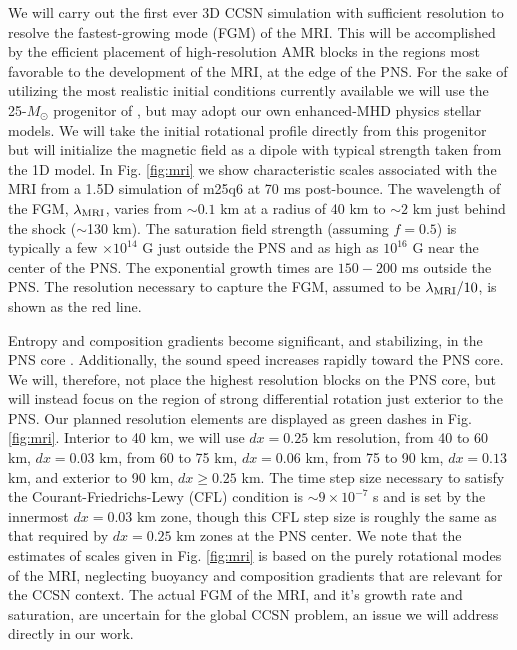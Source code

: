 We will carry out the first ever 3D CCSN simulation with sufficient resolution to resolve the fastest-growing mode (FGM) of the MRI.  
This will be accomplished by the efficient placement of high-resolution AMR blocks in the regions most favorable to the development of the MRI, at the edge of the PNS.  
For the sake of utilizing the most realistic initial conditions currently available we will use the 25-$M_\odot$ progenitor of \citep{Heger:2005bi}, but may adopt our own enhanced-MHD physics stellar models.  
We will take the initial rotational profile directly from this progenitor but will initialize the magnetic field as a dipole with typical strength taken from the 1D model. 
In Fig. \ref{fig:mri} we show characteristic scales associated with the MRI from a 1.5D simulation of m25q6 at 70 ms post-bounce.  
The wavelength of the FGM, $\lambda_{\rm MRI}$, varies from $\sim0.1$ km at a radius of 40 km to $\sim2$ km just behind the shock ($\sim$130 km).  
The saturation field strength (assuming $f=0.5$) is typically a few $\times 10^{14}$ G just outside the PNS and as high as $10^{16}$ G near the center of the PNS.  
The exponential growth times are $150-200$ ms outside the PNS.  
The resolution necessary to capture the FGM, assumed to be $\lambda_{\rm
  MRI}/10$, is shown as the red line.

Entropy and composition gradients become significant, and stabilizing, in the PNS core \citep{Obergaulinger:2009fv}.  
Additionally, the sound speed increases rapidly toward the PNS core.  
We will, therefore, not place the highest resolution blocks on the PNS core, but will instead focus on the region of strong differential rotation just exterior to the PNS.  
Our planned resolution elements are displayed as green dashes in Fig. \ref{fig:mri}.  
Interior to 40 km, we will use $dx = 0.25$ km resolution, from 40 to 60 km, $dx = 0.03$ km, from 60 to 75 km, $dx = 0.06$ km, from 75 to 90 km, $dx = 0.13$ km, and exterior to 90 km, $dx \geq 0.25$ km.  
The time step size necessary to satisfy the Courant-Friedrichs-Lewy (CFL) condition is $\sim 9\times10^{-7}$ s and is set by the innermost $dx = 0.03$ km zone, though this CFL step size is roughly the same as that required by $dx = 0.25$ km zones at the PNS center.
We note that the estimates of scales given in Fig. \ref{fig:mri} is based on the purely rotational modes of the MRI, neglecting buoyancy and composition gradients that are relevant for the CCSN context.
The actual FGM of the MRI, and it's growth rate and saturation, are uncertain for the global CCSN problem, an issue we will address directly in our work.

